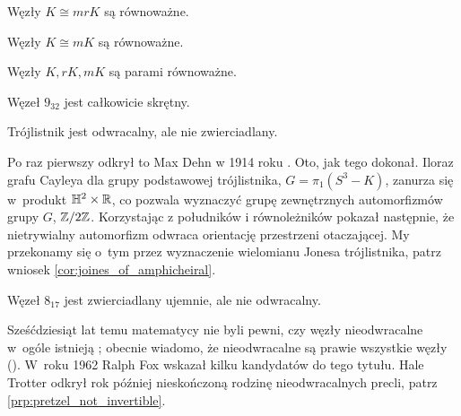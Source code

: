 \begin{definition}
    Węzły $K \cong mrK$ są równoważne. %
\end{definition}

\begin{definition}
    Węzły $K \cong mK$ są równoważne. %
\end{definition}

\begin{definition}
    Węzły $K, rK, mK$ są parami równoważne. %
\end{definition}

\begin{example}
    Węzeł $9_{32}$ jest całkowicie skrętny.
\end{example}


\begin{example}
    \label{exm:trefoil_is_chiral}
    Trójlistnik jest odwracalny, ale nie zwierciadlany.
\end{example}

Po raz pierwszy odkrył to Max Dehn w 1914 roku \cite{dehn14}.
Oto, jak tego dokonał.
Iloraz grafu Cayleya dla grupy podstawowej trójlistnika, $G = \pi_1(S^3 - K)$, zanurza się w~produkt $\mathbb H^2 \times \mathbb R$, co pozwala wyznaczyć grupę zewnętrznych automorfizmów grupy $G$, $\mathbb Z/2\mathbb Z$.
Korzystając z południków i równoleżników pokazał następnie, że nietrywialny automorfizm odwraca orientację przestrzeni otaczającej.
My przekonamy się o~tym przez wyznaczenie wielomianu Jonesa trójlistnika, patrz wniosek \ref{cor:joines_of_amphicheiral}.

\begin{example}
    Węzeł $8_{17}$ jest zwierciadlany ujemnie, ale nie odwracalny.
\end{example}

Sześćdziesiąt lat temu matematycy nie byli pewni, czy węzły nieodwracalne w~ogóle istnieją \cite[problem 10]{fox62};
obecnie wiadomo, że nieodwracalne są prawie wszystkie węzły (\cite[s.~46]{murasugi96}).
W~roku 1962 Ralph Fox wskazał kilku kandydatów do tego tytułu.
%
Hale Trotter odkrył rok później nieskończoną rodzinę nieodwracalnych precli, patrz \ref{prp:pretzel_not_invertible}.
%

